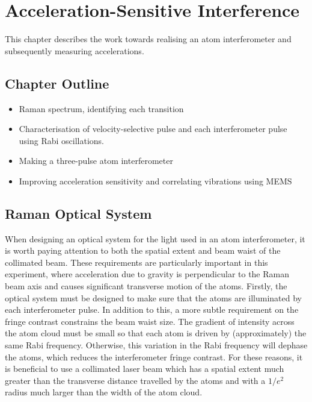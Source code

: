 \chapter{Acceleration-Sensitive Interference}\label{chap:atom_int}
This chapter describes the work towards realising an atom interferometer and subsequently measuring accelerations.
\section{Chapter Outline}
\begin{itemize}
    \item Raman spectrum, identifying each transition
    \item Characterisation of velocity-selective pulse and each interferometer pulse using Rabi oscillations.
    \item Making a three-pulse atom interferometer
    \item Improving acceleration sensitivity and correlating vibrations using MEMS
\end{itemize}
\section{Raman Optical System}\label{sec:setup_ramanoptics}

When designing an optical system for the light used in an atom interferometer, it is worth paying attention to both the spatial extent and beam waist of the collimated beam. These requirements are particularly important in this experiment, where acceleration due to gravity is perpendicular to the Raman beam axis and causes significant transverse motion of the atoms. Firstly, the optical system must be designed to make sure that the atoms are illuminated by each interferometer pulse. In addition to this, a more subtle requirement on the fringe contrast constrains the beam waist size. The gradient of intensity across the atom cloud must be small so that each atom is driven by (approximately) the same Rabi frequency. Otherwise, this variation in the Rabi frequency will dephase the atoms, which reduces the interferometer fringe contrast. 
For these reasons, it is beneficial to use a collimated laser beam which has a spatial extent much greater than the transverse distance travelled by the atoms and with a \(1/e^2\) radius much larger than the width of the atom cloud.

